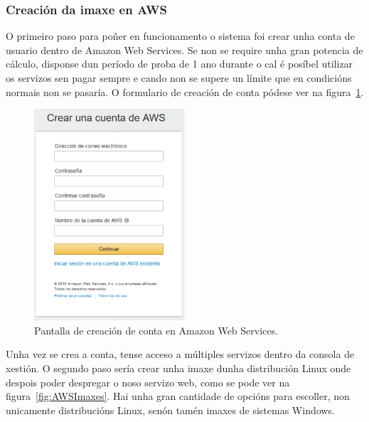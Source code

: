 \subsubsection{Creación da imaxe en AWS}
O primeiro paso para poñer en funcionamento o sistema foi crear unha conta de usuario dentro de Amazon Web Services. Se non se require unha gran potencia de cálculo, disponse dun período de proba de 1 ano durante o cal é posíbel utilizar os servizos sen pagar sempre e cando non se supere un límite que en condicións normais non se pasaría. O formulario de creación de conta pódese ver na figura~\ref{fig:AWSCrear}.

\begin{figure}[h]
	\begin{center}
		\includegraphics[width=0.5\textwidth]{figures/capturas/AWSCrear}
		\caption{Pantalla de creación de conta en Amazon Web Services.}
		\label{fig:AWSCrear}
	\end{center}
\end{figure}


Unha vez se crea a conta, tense acceso a múltiples servizos dentro da consola de xestión. O segundo paso sería crear unha imaxe dunha distribución Linux onde despois poder despregar o noso servizo web, como se pode ver na figura~\ref{fig:AWSImaxes}. Hai unha gran cantidade de opcións para escoller, non unicamente distribucións Linux, senón tamén imaxes de sistemas Windows. 

